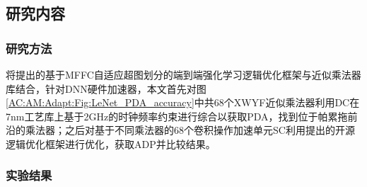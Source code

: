\subsection{研究内容}

\subsubsection{研究方法}

将提出的基于MFFC自适应超图划分的端到端强化学习逻辑优化框架与近似乘法器库结合，针对DNN硬件加速器，本文首先对图\ref{AC:AM:Adapt:Fig:LeNet_PDA_accuracy}中共68个XWYF近似乘法器利用DC在7nm工艺库\cite{ASAP7_github}上基于2GHz的时钟频率约束进行综合以获取PDA，找到位于帕累拖前沿的乘法器；之后对基于不同乘法器的68个卷积操作加速单元SC\cite{Accelerator:SC}利用提出的开源逻辑优化框架进行优化，获取ADP并比较结果。


\subsubsection{实验结果}

